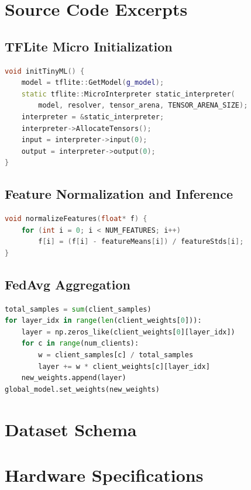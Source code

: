 \documentclass[12pt, a4paper, twoside, openright]{report}
\begin{document}
\clearpage{}




\begin{appendices}

\chapter{Source Code Excerpts}

\section{TFLite Micro Initialization}
\begin{lstlisting}[language=C++, caption={Model loading on MKR WAN 1310.}]
void initTinyML() {
    model = tflite::GetModel(g_model);
    static tflite::MicroInterpreter static_interpreter(
        model, resolver, tensor_arena, TENSOR_ARENA_SIZE);
    interpreter = &static_interpreter;
    interpreter->AllocateTensors();
    input = interpreter->input(0);
    output = interpreter->output(0);
}
\end{lstlisting}

\section{Feature Normalization and Inference}
\begin{lstlisting}[language=C++, caption={On-device normalization and path loss prediction.}]
void normalizeFeatures(float* f) {
    for (int i = 0; i < NUM_FEATURES; i++)
        f[i] = (f[i] - featureMeans[i]) / featureStds[i];
}
\end{lstlisting}

\section{FedAvg Aggregation}
\begin{lstlisting}[language=Python, caption={Server-side federated averaging.}]
total_samples = sum(client_samples)
for layer_idx in range(len(client_weights[0])):
    layer = np.zeros_like(client_weights[0][layer_idx])
    for c in range(num_clients):
        w = client_samples[c] / total_samples
        layer += w * client_weights[c][layer_idx]
    new_weights.append(layer)
global_model.set_weights(new_weights)
\end{lstlisting}

\chapter{Dataset Schema}

\chapter{Hardware Specifications}

\end{appendices}
\end{document}

